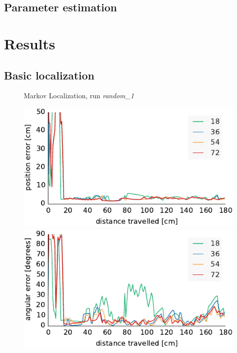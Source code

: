 \documentclass[letterpaper, 10pt, conference]{ieeeconf}
\begin{document}
\subsection{Parameter estimation}
\label{sec:mle}

\section{Results}

\subsection{Basic localization}

\begin{figure}

\begin{center}
Markov Localization, run \emph{random\_1}
\end{center}
\includegraphics{ml-whole_random_1-xy}\hfill
\includegraphics{ml-whole_random_1-theta}

\vspace{.5em}


\end{figure}
\end{document}
